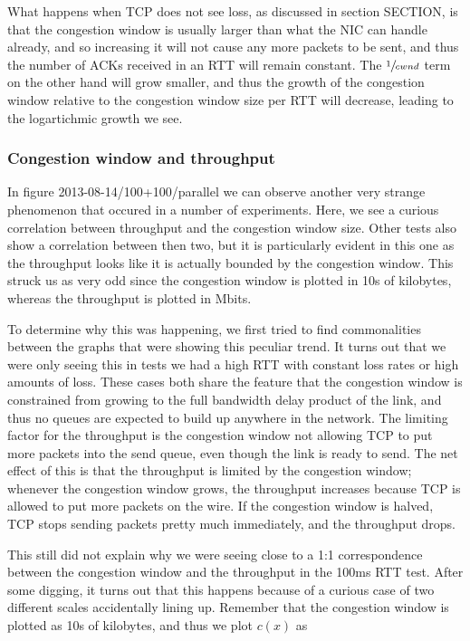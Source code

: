 \documentclass[12pt,a4paper]{article}
\begin{document}
What happens when TCP does not see loss, as discussed in section SECTION, is   %
that the congestion window is usually larger than what the NIC can handle
already, and so increasing it will not cause any more packets to be sent, and
thus the number of ACKs received in an RTT will remain constant. The
$\sfrac{1}{cwnd}$ term on the other hand will grow smaller, and thus the growth
of the congestion window relative to the congestion window size per RTT will
decrease, leading to the logartichmic growth we see.

\subsubsection{Congestion window and throughput}
In figure 2013-08-14/100+100/parallel we can observe another very strange      %
phenomenon that occured in a number of experiments. Here, we see a curious
correlation between throughput and the congestion window size. Other tests also
show a correlation between then two, but it is particularly evident in this one
as the throughput looks like it is actually bounded by the congestion window.
This struck us as very odd since the congestion window is plotted in 10s of
kilobytes, whereas the throughput is plotted in Mbits.

To determine why this was happening, we first tried to find commonalities
between the graphs that were showing this peculiar trend. It turns out that we
were only seeing this in tests we had a high RTT with constant loss rates or
high amounts of loss. These cases both share the feature that the congestion
window is constrained from growing to the full bandwidth delay product of the
link, and thus no queues are expected to build up anywhere in the network. The
limiting factor for the throughput is the congestion window not allowing TCP to
put more packets into the send queue, even though the link is ready to send. The
net effect of this is that the throughput is limited by the congestion window;
whenever the congestion window grows, the throughput increases because TCP is
allowed to put more packets on the wire. If the congestion window is halved, TCP
stops sending packets pretty much immediately, and the throughput drops.

This still did not explain why we were seeing close to a 1:1 correspondence
between the congestion window and the throughput in the 100ms RTT test. After
some digging, it turns out that this happens because of a curious case of two
different scales accidentally lining up. Remember that the congestion window is
plotted as 10s of kilobytes, and thus we plot $c(x)$ as
\end{document}
